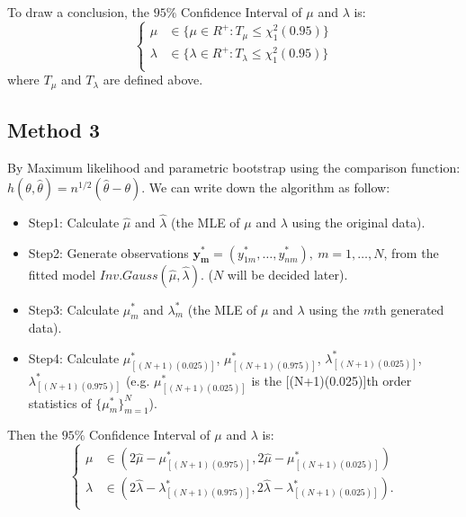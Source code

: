 \documentclass[12pt]{article}
\begin{document}
To draw a conclusion, the $95\%$ Confidence Interval of $\mu$ and $\lambda$ is: 
 \begin{equation*}
\left\{                         
\begin{aligned}
\mu &\in \{  \mu \in R^{+}:  T_{\mu}  \leq    \chi_{1}^2 (0.95) \}\\
\lambda &\in \{  \lambda \in R^{+}:  T_{\lambda}  \leq    \chi_{1}^2 (0.95) \}\\
\end{aligned}
\right.
\end{equation*}
where $T_{\mu}$ and $T_{\lambda}$ are defined above.

\subsection{Method 3}
By Maximum likelihood and parametric bootstrap using the comparison function: $h(\theta,\hat{\theta})=n^{1/2}(\hat{\theta}-\theta)$. We can write down the algorithm as follow:
\begin{itemize}
  \item Step1: Calculate $\hat{\mu}$ and $\hat{\lambda}$ (the MLE of $\mu$ and $\lambda$ using the original data).
  \item Step2: Generate observations $\pmb{y_{m}^{*}}=(y_{1m}^{*},\dots,y_{nm}^{*}), \ m=1,\dots,N$, from the fitted model $Inv.Gauss(\hat{\mu},\hat{\lambda})$. ($N$ will be decided later).
  \item Step3: Calculate $\mu_{m}^{*}$ and $\lambda_{m}^{*}$ (the MLE of $\mu$ and $\lambda$ using the $m$th generated data).
  \item Step4: Calculate $\mu_{[(N+1)(0.025)]}^{*}$, $\mu_{[(N+1)(0.975)]}^{*}$, $\lambda_{[(N+1)(0.025)]}^{*}$, $\lambda_{[(N+1)(0.975)]}^{*}$ (e.g. $\mu_{[(N+1)(0.025)]}^{*}$ is the [(N+1)(0.025)]th order statistics of $\{\mu_{m}^{*}\}_{m=1}^{N}$).
\end{itemize}

Then the $95\%$ Confidence Interval of $\mu$ and $\lambda$ is: 
 \begin{equation*}
\left\{                         
\begin{aligned}
\mu &\in (2\hat{\mu}-\mu_{[(N+1)(0.975)]}^{*},2\hat{\mu}-\mu_{[(N+1)(0.025)]}^{*})\\
\lambda &\in (2\hat{\lambda}-\lambda_{[(N+1)(0.975)]}^{*},2\hat{\lambda}-\lambda_{[(N+1)(0.025)]}^{*}).\\
\end{aligned}
\right.
\end{equation*}
\end{document}
